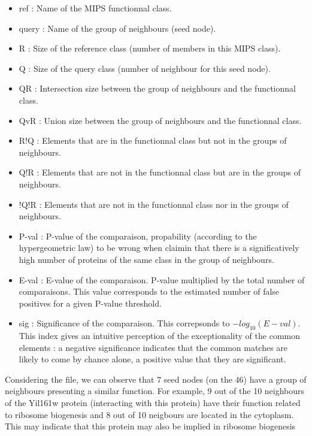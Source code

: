 \begin{itemize}
 \item ref : Name of the MIPS functionnal class.
 \item query : Name of the group of neighbours (seed node).
 \item R : Size of the reference class (number of members in this MIPS class).
 \item Q : Size of the query class (number of neighbour for this seed node).
 \item QR : Intersection size between the group of neighbours and the functionnal class.
 \item QvR : Union size between the group of neighbours and the functionnal class.
 \item R!Q : Elements that are in the functionnal class but not in the groups of neighbours.
 \item Q!R : Elements that are not in the functionnal class but are in the groups of neighbours.
 \item !Q!R : Elements that are not in the functionnal class nor in the groups of neighbours.
 \item P-val : P-value of the comparaison, propability (according to the hypergeometric law) to be wrong when claimin that there is a significatively high number of proteins of the same class in the group of neighbours.
 \item E-val : E-value of the comparaison. P-value multiplied by the total number of comparaisons. This value corresponds to the estimated number of false positives for a given P-value threshold.
 \item sig : Significance of the comparaison. This correpsonds to $-log_{10}(E-val)$. This index gives an intuitive perception of the exceptionality of the common elements : a negative significance indicates that the common matches are likely to come by chance alone, a positive value that they are significant.
\end{itemize}

Considering the file, we can observe that 7 seed nodes (on the 46) have a group of neighbours presenting a similar function. 
For example, 9 out of the 10 neighbours of the Yil161w protein (interacting with this protein) have their function related to ribosome biogenesis and 8 out of 10 neigbours are located in the cytoplasm. This may indicate that this protein may also be implied in ribosome biogenesis 



